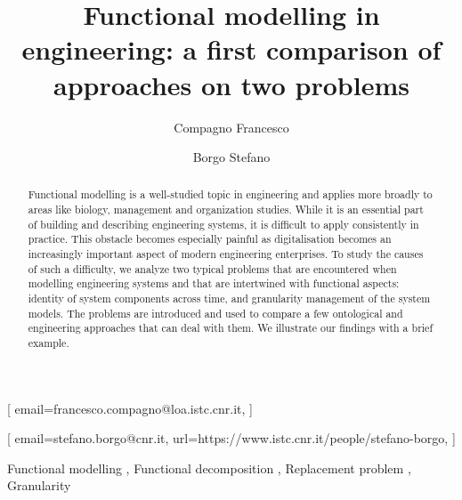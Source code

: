 \documentclass[
]{ceurart}
\begin{document}


\title{Functional modelling in engineering: a first comparison of approaches on two problems}


\author[1,2]{Compagno Francesco}[%
email=francesco.compagno@loa.istc.cnr.it,
]
\cormark[1]
\address[1]{ISTC-CNR Laboratory for Applied Ontology, via alla cascata 56/C, 38123, Povo, Italy}
\address[2]{Adige S.P.A, via per Barco, 11, Levico Terme, 38056, Italy}

\author[1]{Borgo Stefano}[%
email=stefano.borgo@cnr.it,
url=https://www.istc.cnr.it/people/stefano-borgo,
]



\begin{abstract}
  Functional modelling is a well-studied topic in engineering and applies more broadly to areas like biology, management and organization studies. 
  While it is an essential part of building and describing engineering systems, it is difficult to apply consistently in practice.
  This obstacle becomes especially painful as digitalisation becomes an increasingly important aspect of modern engineering enterprises.
  To study the causes of such a difficulty, we analyze two typical problems that are encountered when modelling engineering systems and that are intertwined with functional aspects: identity of system components across time, and granularity management of the system models.
  The problems are introduced and used to compare a few ontological and engineering approaches that can deal with them. We illustrate our findings with a brief example.
\end{abstract}

\begin{keywords}
  Functional modelling \sep
  Functional decomposition \sep
  Replacement problem \sep
  Granularity
\end{keywords}
\end{document}
